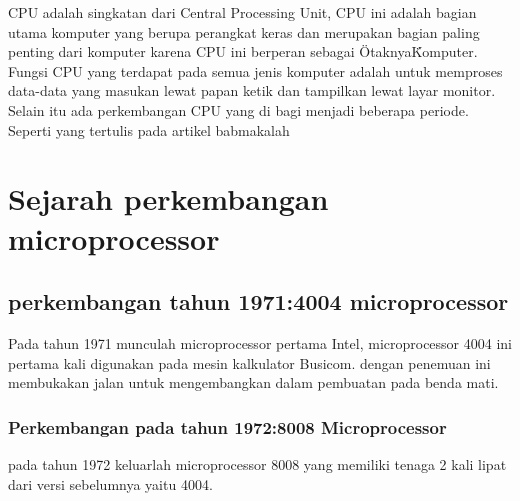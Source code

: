 	
CPU adalah singkatan dari Central Processing Unit, CPU ini adalah bagian utama komputer yang berupa perangkat keras dan merupakan bagian paling penting dari komputer karena CPU ini berperan sebagai \"Otaknya\" Komputer. Fungsi CPU yang terdapat pada semua jenis komputer adalah untuk memproses data-data yang masukan lewat papan ketik dan tampilkan lewat layar monitor. Selain itu ada perkembangan CPU yang di bagi menjadi beberapa periode. Seperti yang tertulis pada artikel babmakalah \cite{babmakalah}


\section{Sejarah perkembangan microprocessor}
	\subsection{perkembangan tahun 1971:4004 microprocessor}
	Pada tahun 1971 munculah microprocessor pertama Intel, microprocessor 4004 ini pertama kali digunakan pada mesin kalkulator Busicom. dengan penemuan ini membukakan jalan untuk mengembangkan dalam pembuatan pada benda mati.
	\subsubsection{Perkembangan pada tahun 1972:8008 Microprocessor}
	pada tahun 1972 keluarlah microprocessor 8008 yang memiliki tenaga 2 kali lipat dari versi sebelumnya yaitu 4004.
